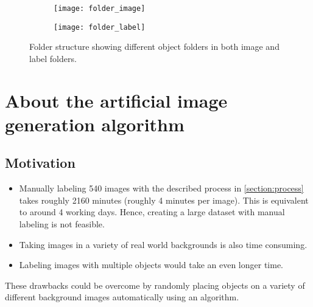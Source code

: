 \documentclass[paper=a4,11pt,parskip=half,toc=listof]{scrartcl}
\begin{document}
\begin{center}
	\begin{figure}[!htb]
		\begin{subfigure}{.5\textwidth}
			\centering
			\texttt{[image: folder\_image]}
			\label{Fig:fsila}
		\end{subfigure}
		\begin{subfigure}{.5\textwidth}
			\centering
			\texttt{[image: folder\_label]}
			\label{Fig:fsilb}
		\end{subfigure}
		\caption{Folder structure showing different object folders in both image and label folders.}
		\label{Fig:fsil}
	\end{figure}
\end{center}

\section{About the artificial image generation algorithm}
\subsection{Motivation}
	\begin{itemize}
		\item Manually labeling 540 images with the described process in \ref{section:process} takes roughly 2160 minutes (roughly 4 minutes per image). This is equivalent to around 4 working days. Hence, creating a large dataset with manual labeling is not feasible.
		\item Taking images in a variety of real world backgrounds is also time consuming.
		\item Labeling images with multiple objects would take an even longer time.
	\end{itemize}
	
These drawbacks could be overcome by randomly placing objects on a variety of different background images automatically using an algorithm.
\end{document}
